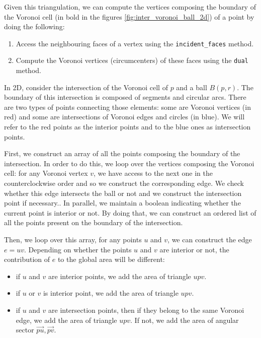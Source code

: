 Given this triangulation, we can compute the vertices composing the boundary of
the  Voronoi cell (in bold in the figures \ref{fig:inter_voronoi_ball_2d}) of a
point by doing the following:
\begin{enumerate}
    \item Access the neighbouring faces of a vertex using the
        \texttt{incident\_faces} method.
    \item Compute the Voronoi vertices (circumcenters) of these faces using the
        \texttt{dual} method.
\end{enumerate}

In 2D, consider the intersection of the Voronoi cell of $ p $ and a ball $ B(p,
r) $. The boundary of this intersection is composed of segments and circular
arcs. There are two types of points connecting those elements: some are Voronoi
vertices (in red) and some are intersections of Voronoi edges and circles (in
blue). We will refer to the red points as the interior points and to the blue
ones as intersection points.

First, we construct an array of all the points composing the boundary of the
intersection. In order to do this, we loop over the vertices composing the
Voronoi cell: for any Voronoi vertex $ v $, we have access to the next one in
the counterclockwise order and so we construct the corresponding edge. We check
whether this edge intersects the ball or not and we construct the intersection
point if necessary.. In parallel, we maintain a boolean indicating whether the
current point is interior or not. By doing that, we can construct an ordered
list of all the points present on the boundary of the intersection.

Then, we loop over this array, for any points $ u $ and $ v $, we can construct
the edge $ e = uv $. Depending on whether the points $ u $ and $ v $ are
interior or not, the contribution of $ e $ to the global area will be different:
\begin{itemize}
    \item if $ u $ and $ v $ are interior points, we add the area of triangle $ upv $.
    \item if $ u $ or $ v $ is interior point, we add the area of triangle $ upv $.
    \item if $ u $ and $ v $ are intersection points, then if they belong to the
        same Voronoi edge, we add the area of triangle $ upv $. If not, we add the
        area of angular sector $ \vec{pu}, \vec{pv} $.
\end{itemize}

